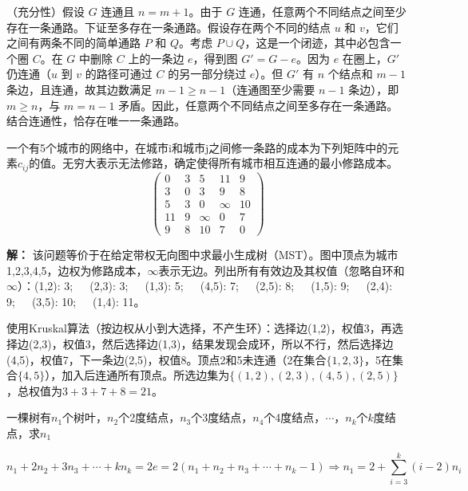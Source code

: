 \documentclass[lang=cn,11pt]{elegantbook}
\begin{document}
（充分性）假设 $G$ 连通且 $n = m+1$。由于 $G$ 连通，任意两个不同结点之间至少存在一条通路。下证至多存在一条通路。假设存在两个不同的结点 $u$ 和 $v$，它们之间有两条不同的简单通路 $P$ 和 $Q$。考虑 $P \cup Q$，这是一个闭迹，其中必包含一个圈 $C$。在 $G$ 中删除 $C$ 上的一条边 $e$，得到图 $G' = G - e$。因为 $e$ 在圈上，$G'$ 仍连通（$u$ 到 $v$ 的路径可通过 $C$ 的另一部分绕过 $e$）。但 $G'$ 有 $n$ 个结点和 $m-1$ 条边，且连通，故其边数满足 $m-1 \ge n-1$（连通图至少需要 $n-1$ 条边），即 $m \ge n$，与 $m = n-1$ 矛盾。因此，任意两个不同结点之间至多存在一条通路。结合连通性，恰存在唯一一条通路。

\begin{example}
    一个有5个城市的网络中，在城市i和城市j之间修一条路的成本为下列矩阵中的元素$c_{ij}$的值。无穷大表示无法修路，确定使得所有城市相互连通的最小修路成本。
    \[\begin{pmatrix}
        0&3&5&11&9\\
        3&0&3&9&8\\
        5&3&0&\infty&10\\
        11&9&\infty&0&7\\
        9&8&10&7&0
    \end{pmatrix}\]
\end{example}
\textbf{解：} 该问题等价于在给定带权无向图中求最小生成树（MST）。图中顶点为城市1,2,3,4,5，边权为修路成本，$\infty$表示无边。列出所有有效边及其权值（忽略自环和$\infty$）：(1,2): 3;~~~(2,3): 3;~~~(1,3): 5;~~~(4,5): 7;~~~(2,5): 8;~~~(1,5): 9;~~~(2,4): 9;~~~(3,5): 10;~~~(1,4): 11。

使用Kruskal算法（按边权从小到大选择，不产生环）：选择边(1,2)，权值3，再选择边(2,3)，权值3，然后选择边(1,3)，结果发现会成环，所以不行，然后选择边(4,5)，权值7，下一条边(2,5)，权值8。顶点2和5未连通（2在集合$\{1,2,3\}$，5在集合$\{4,5\}$），加入后连通所有顶点。所选边集为$\{(1,2),(2,3),(4,5),(2,5)\}$，总权值为$3+3+7+8=21$。
\begin{example}
    一棵树有$n_1$个树叶，$n_2$个2度结点，$n_3$个3度结点，$n_4$个4度结点，$\cdots$，$n_k$个$k$度结点，求$n_1$
\end{example}
\vspace{-20pt}\[n_1+2n_2+3n_3+\cdots+kn_k=2e=2(n_1+n_2+n_3+\cdots+n_k-1)\Rightarrow n_1 = 2 + \sum_{i=3}^k (i-2)n_i\]
\end{document}
